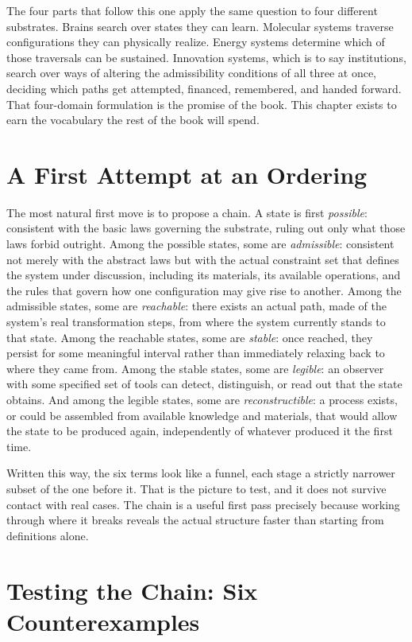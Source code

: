 \documentclass[11pt]{book}
\begin{document}
The four parts that follow this one apply the same question to four different substrates. Brains search over states they can learn. Molecular systems traverse configurations they can physically realize. Energy systems determine which of those traversals can be sustained. Innovation systems, which is to say institutions, search over ways of altering the admissibility conditions of all three at once, deciding which paths get attempted, financed, remembered, and handed forward. That four-domain formulation is the promise of the book. This chapter exists to earn the vocabulary the rest of the book will spend.

\section{A First Attempt at an Ordering}

The most natural first move is to propose a chain. A state is first \emph{possible}: consistent with the basic laws governing the substrate, ruling out only what those laws forbid outright. Among the possible states, some are \emph{admissible}: consistent not merely with the abstract laws but with the actual constraint set that defines the system under discussion, including its materials, its available operations, and the rules that govern how one configuration may give rise to another. Among the admissible states, some are \emph{reachable}: there exists an actual path, made of the system's real transformation steps, from where the system currently stands to that state. Among the reachable states, some are \emph{stable}: once reached, they persist for some meaningful interval rather than immediately relaxing back to where they came from. Among the stable states, some are \emph{legible}: an observer with some specified set of tools can detect, distinguish, or read out that the state obtains. And among the legible states, some are \emph{reconstructible}: a process exists, or could be assembled from available knowledge and materials, that would allow the state to be produced again, independently of whatever produced it the first time.

Written this way, the six terms look like a funnel, each stage a strictly narrower subset of the one before it. That is the picture to test, and it does not survive contact with real cases. The chain is a useful first pass precisely because working through where it breaks reveals the actual structure faster than starting from definitions alone.

\section{Testing the Chain: Six Counterexamples}
\end{document}
